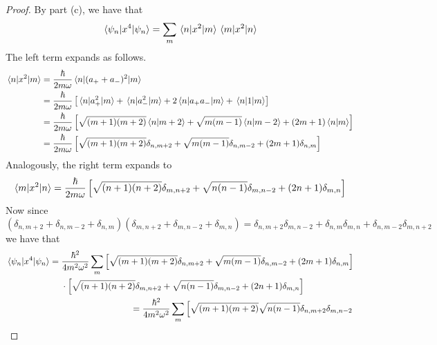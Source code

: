 \documentclass[../psets.tex]{subfiles}
\begin{document}
\begin{enumerate}
\begin{enumerate}
        \begin{proof}
            By part (c), we have that
            \begin{equation*}
                \ev{x^4}{\psi_n} = \sum_m\mel{n}{x^2}{m}\mel{m}{x^2}{n}
            \end{equation*}
            The left term expands as follows.
            \begin{align*}
                \mel{n}{x^2}{m} &= \frac{\hbar}{2m\omega}\mel{n}{(a_++a_-)^2}{m}\\
                &= \frac{\hbar}{2m\omega}\left[ \mel{n}{a_+^2}{m}+\mel{n}{a_-^2}{m}+2\mel{n}{a_+a_-}{m}+\mel{n}{1}{m} \right]\\
                &= \frac{\hbar}{2m\omega}\left[ \sqrt{(m+1)(m+2)}\braket{n}{m+2}+\sqrt{m(m-1)}\braket{n}{m-2}+(2m+1)\braket{n}{m} \right]\\
                &= \frac{\hbar}{2m\omega}\left[ \sqrt{(m+1)(m+2)}\delta_{n,m+2}+\sqrt{m(m-1)}\delta_{n,m-2}+(2m+1)\delta_{n,m} \right]
            \end{align*}
            Analogously, the right term expands to
            \begin{equation*}
                \mel{m}{x^2}{n} = \frac{\hbar}{2m\omega}\left[ \sqrt{(n+1)(n+2)}\delta_{m,n+2}+\sqrt{n(n-1)}\delta_{m,n-2}+(2n+1)\delta_{m,n} \right]
            \end{equation*}
            Now since
            \begin{equation*}
                (\delta_{n,m+2}+\delta_{n,m-2}+\delta_{n,m})(\delta_{m,n+2}+\delta_{m,n-2}+\delta_{m,n}) = \delta_{n,m+2}\delta_{m,n-2}+\delta_{n,m}\delta_{m,n}+\delta_{n,m-2}\delta_{m,n+2}
            \end{equation*}
            we have that
            \begin{align*}
                \begin{split}
                    \ev{x^4}{\psi_n} ={}& \frac{\hbar^2}{4m^2\omega^2}\sum_m\left[ \sqrt{(m+1)(m+2)}\delta_{n,m+2}+\sqrt{m(m-1)}\delta_{n,m-2}+(2m+1)\delta_{n,m} \right]\\
                    & \cdot\left[ \sqrt{(n+1)(n+2)}\delta_{m,n+2}+\sqrt{n(n-1)}\delta_{m,n-2}+(2n+1)\delta_{m,n} \right]
                \end{split}\\
                \begin{split}
                    ={}& \frac{\hbar^2}{4m^2\omega^2}\sum_m\left[ \sqrt{(m+1)(m+2)}\sqrt{n(n-1)}\delta_{n,m+2}\delta_{m,n-2} \right.\\

\end{split}
\end{align*}
\end{proof}
\end{enumerate}
\end{enumerate}
\end{document}
